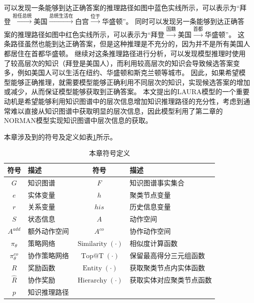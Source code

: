 \documentclass[algorithmlist, AutoFakeBold, AutoFakeSlant, figurelist, tablelist, nomlist, engineering]{seuthesix}
\begin{document}
可以发现一条能够到达正确答案的推理路径如图中蓝色实线所示，可以表示为“拜登$\xrightarrow{\mbox{担任总统}}$美国$\xrightarrow{\mbox{总统生活在}}$白宫$\xrightarrow{\mbox{位于}}$华盛顿”。
同时可以发现另一条能够到达正确答案的推理路径如图中红色实线所示，可以表示为“拜登$\xrightarrow{\mbox{国籍}}$美国$\xrightarrow{\mbox{首都}}$华盛顿”。
这条路径虽然也能到达正确答案，但是这种推理是不充分的，因为并不是所有美国人都居住在首都华盛顿。
继续对这条推理路径进行分析，可以发现模型推理时使用了较高层次的知识（拜登是美国人），而利用较高层次的知识会导致候选答案变多，例如美国人可以生活在纽约、华盛顿和斯克兰顿等城市。
因此，如果希望模型能够正确推理，就需要模型能够正确利用不同层次的知识，实现候选答案的增加或减少，从而保证模型能够获取到正确答案。
本文提出的LAURA模型的一个重要动机是希望能够利用知识图谱中的层次信息增加知识推理路径的充分性，考虑到通常难以直接从知识图谱中获取明显的层次信息，因此模型利用了第二章的NORMAN模型实现知识图谱中层次信息的获取。

本章涉及到的符号及定义如表\ref{3_symbols}所示。
\begin{table}[ht]
  \centering
  \caption{本章符号定义}
  \begin{tabular*}{0.8\textwidth}{@{\extracolsep{\fill}}clcl}
		\toprule[1pt]
    符号 & 描述 & 符号 & 描述\\ \hline
    $G$ & 知识图谱 & $F$ & 知识图谱事实集合\\
    $e$ & 实体变量 & $h$ & 聚类节点变量\\
    $r$ & 关系变量 & $his$ & 历史信息变量\\
    $S$ & 状态信息 & $A$ & 动作空间\\
    $A^{add}$ & 额外动作空间 & $A^{co}$ & 协作动作空间\\
    $\pi_\theta$ & 策略网络 & $\operatorname{Similarity}(\cdot)$ & 相似度计算函数\\
    $\pi_\theta^{co}$ & 协作策略网络 & $\operatorname{Top@T}(\cdot)$ & 保留最高得分三元组函数\\
    $R$ & 奖励函数 & $\operatorname{Entity}(\cdot)$ & 获取聚类节点内实体函数\\
    $\hat{R}$ & 协作奖励 & $\operatorname{Hierarchy}(\cdot)$ & 获取实体对应聚类节点函数\\
    $p$ & 知识推理路径 & &\\
		\bottomrule[1pt]
	\end{tabular*}
  \label{3_symbols}
\end{table}
\end{document}
